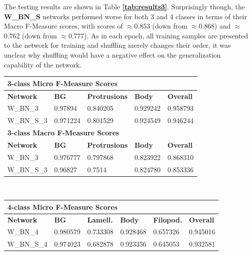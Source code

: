 The testing results are shown in Table \textbf{\ref{tab:results3}}. Surprisingly though, the \textbf{W\_BN\_S} networks performed worse for both 3 and 4 classes in terms of their Macro F-Measure scores, with scores of $\approx$0.853 (down from $\approx$0.868) and $\approx$0.762 (down from $\approx$0.777). As in each epoch, all training samples are presented to the network for training and shuffling merely changes their order, it was unclear why shuffling would have a negative effect on the generalization capability of the network.


\begin {table}
	\begin{flushleft}
		\begin {tabular}[!htb]{|l|l|l|l|l|}
			\hline\multicolumn{5}{|l|}{\textbf{3-class Micro F-Measure Scores}} \\ \hline
			\textbf{Network}& \textbf{BG}& \textbf{Protrusions}& \textbf{Body}& \textbf{Overall} \\ \hline
			W\_BN\_3& \cellcolor{green!25}0.97894& \cellcolor{green!25}0.840205& \cellcolor{green!25}0.929242& \cellcolor{green!25}0.958793 \\ \hline
			W\_BN\_S\_3& 0.971224& 0.801529& 0.924549& 0.946244 \\ \hline
			\multicolumn{5}{|l|}{\textbf{3-class Macro F-Measure Scores}} \\ \hline
			\textbf{Network}& \textbf{BG}& \textbf{Protrusions}& \textbf{Body}& \textbf{Overall} \\ \hline
			W\_BN\_3& \cellcolor{green!25}0.976777& \cellcolor{green!25}0.797868& 0.823922& \cellcolor{green!25}0.868310 \\ \hline
			W\_BN\_S\_3& 0.96827& 0.7514& \cellcolor{green!25}0.824780& 0.853336 \\ \hline
		\end {tabular}
		\vspace{0.5cm}\\
		\begin {tabular}[!htb]{|l|l|l|l|l|l|}
			\hline\multicolumn{6}{|l|}{\textbf{4-class Micro F-Measure Scores}} \\ \hline
			\textbf{Network}& \textbf{BG}& \textbf{Lamell.}& \textbf{Body}& \textbf{Filopod.}& \textbf{Overall} \\ \hline
			W\_BN\_4& \cellcolor{green!25}0.980579& \cellcolor{green!25}0.733308& \cellcolor{green!25}0.928468& \cellcolor{green!25}0.657326& \cellcolor{green!25}0.945016 \\ \hline
			W\_BN\_S\_4& 0.974023& 0.682878& 0.923356& 0.645053& 0.932581 \\ \hline

\end{tabular}
\end{flushleft}
\end{table}
